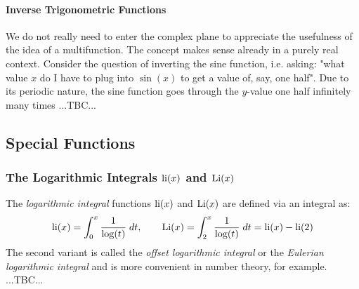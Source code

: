 \paragraph{Inverse Trigonometric Functions} 
We do not really need to enter the complex plane to appreciate the usefulness of the idea of a multifunction. The concept makes sense already in a purely real context. Consider the question of inverting the sine function, i.e. asking: "what value $x$ do I have to plug into $\sin(x)$ to get a value of, say, one half". Due to its periodic nature, the sine function goes through the $y$-value one half infinitely many times ...TBC...








\subsection{Special Functions}

\subsubsection{The Logarithmic Integrals $\operatorname{li}(x)$ and $\operatorname{Li}(x)$}
The \emph{logarithmic integral} functions $\operatorname{li}(x)$ and $\operatorname{Li}(x)$ are defined via an integral as:
\begin{equation}
\label{Eq:LogarithmicIntegral}
 \operatorname{li}(x) = \int_{0}^{x} \frac{1}{\log(t)} \; dt, \qquad
 \operatorname{Li}(x) = \int_{2}^{x} \frac{1}{\log(t)} \; dt
        = \operatorname{li}(x) - \operatorname{li}(2)
\end{equation}
The second variant is called the \emph{offset logarithmic integral} or the \emph{Eulerian logarithmic integral} and is more convenient in number theory, for example. ...TBC...

